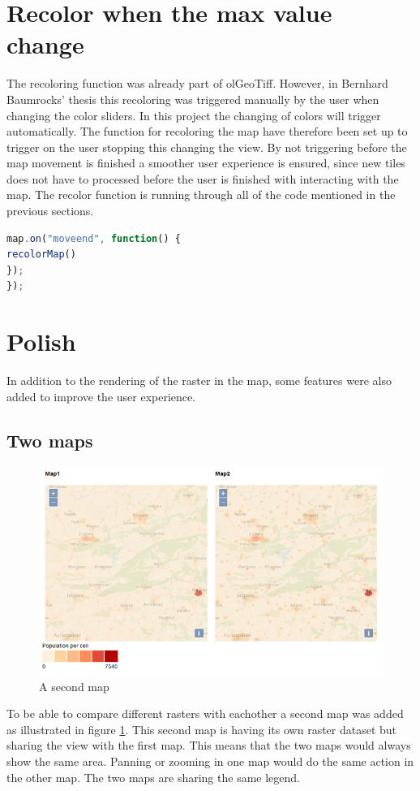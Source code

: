 \section{Recolor when the max value change}

The recoloring function was already part of olGeoTiff. However, in Bernhard Baumrocks’ thesis this recoloring was triggered manually by the user when changing the color sliders. In this project the changing of colors will trigger automatically. The function for recoloring the map have therefore been set up to trigger on the user stopping this changing the view. By not triggering before the map movement is finished a smoother user experience is ensured, since new tiles does not have to processed before the user is finished with interacting with the map. The recolor function is running through all of the code mentioned in the previous sections. 

\begin{lstlisting}[language=JavaScript, caption={The JavaScript in the project}, label= VoresJS,escapechar=|]
map.on("moveend", function() {
recolorMap()
});
});
\end{lstlisting}
\section{Polish}
In addition to the rendering of the raster in the map, some features were also added to improve the user experience.


\subsection{Two maps}

\begin{figure} [H]
	\centering
	\includegraphics[width=.8\textwidth]{Pictures/DualMaps}
	\caption{A second map}
	\label{DualMaps}
\end{figure}
To be able to compare different rasters with eachother a second map was added as illustrated in figure \ref{DualMaps}. This second map is having its own raster dataset but sharing the view with the first map. This means that the two maps would always show the same area. Panning or zooming in one map would do the same action in the other map. The two maps are sharing the same legend. 

